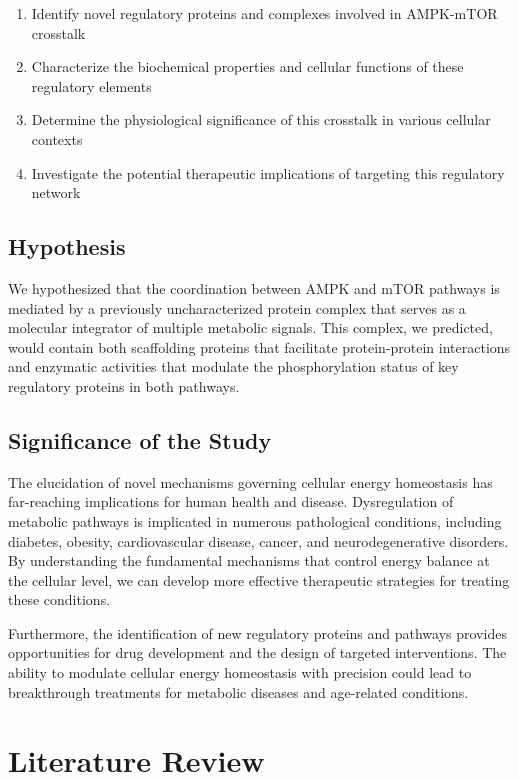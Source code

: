 \documentclass[11pt,a4paper]{article}
\begin{document}
\begin{enumerate}
\item Identify novel regulatory proteins and complexes involved in AMPK-mTOR crosstalk
\item Characterize the biochemical properties and cellular functions of these regulatory elements
\item Determine the physiological significance of this crosstalk in various cellular contexts
\item Investigate the potential therapeutic implications of targeting this regulatory network
\end{enumerate}



\subsection{Hypothesis}

We hypothesized that the coordination between AMPK and mTOR pathways is mediated by a previously uncharacterized protein complex that serves as a molecular integrator of multiple metabolic signals. This complex, we predicted, would contain both scaffolding proteins that facilitate protein-protein interactions and enzymatic activities that modulate the phosphorylation status of key regulatory proteins in both pathways.

\subsection{Significance of the Study}

The elucidation of novel mechanisms governing cellular energy homeostasis has far-reaching implications for human health and disease. Dysregulation of metabolic pathways is implicated in numerous pathological conditions, including diabetes, obesity, cardiovascular disease, cancer, and neurodegenerative disorders. By understanding the fundamental mechanisms that control energy balance at the cellular level, we can develop more effective therapeutic strategies for treating these conditions.

Furthermore, the identification of new regulatory proteins and pathways provides opportunities for drug development and the design of targeted interventions. The ability to modulate cellular energy homeostasis with precision could lead to breakthrough treatments for metabolic diseases and age-related conditions.

\section{Literature Review}
\end{document}
